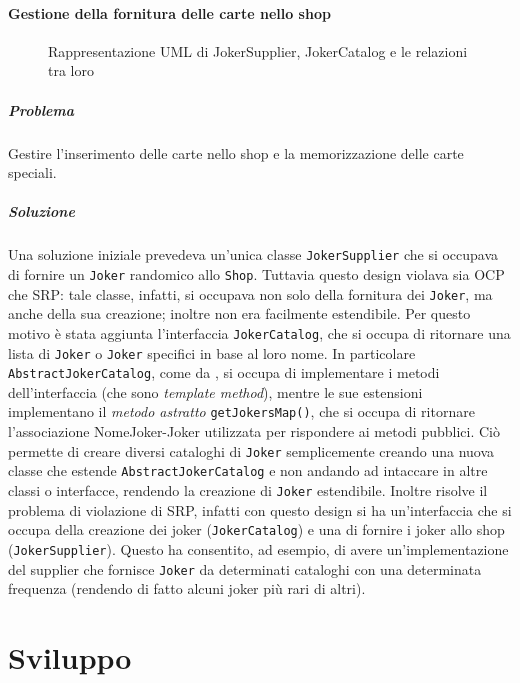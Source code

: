 \documentclass[a4paper,12pt]{report}
\begin{document}
\subsubsection*{Gestione della fornitura delle carte nello shop}
\begin{figure}[H]
	\centering{}
	
	\caption{Rappresentazione UML di JokerSupplier, JokerCatalog e le relazioni tra loro}
	\label{img:JokerSupplier}
\end{figure}
\paragraph{Problema}
Gestire l’inserimento delle carte nello shop e la memorizzazione delle carte speciali.
\paragraph{Soluzione}
Una soluzione iniziale prevedeva un’unica classe \texttt{JokerSupplier} che si occupava di fornire un \texttt{Joker} randomico allo \texttt{Shop}. Tuttavia questo design violava sia OCP che SRP: tale classe, infatti, si occupava non solo della fornitura dei \texttt{Joker}, ma anche della sua creazione; inoltre non era facilmente estendibile. Per questo motivo è stata aggiunta l’interfaccia \texttt{JokerCatalog}, che si occupa di ritornare una lista di \texttt{Joker} o \texttt{Joker} specifici in base al loro nome. In particolare \texttt{AbstractJokerCatalog}, come da , si occupa di implementare i metodi dell’interfaccia (che sono \textit{template method}), mentre le sue estensioni implementano il \textit{metodo astratto} \texttt{getJokersMap()}, che si occupa di ritornare l'associazione NomeJoker-Joker utilizzata per rispondere ai metodi pubblici. Ciò permette di creare diversi cataloghi di \texttt{Joker} semplicemente creando una nuova classe che estende \texttt{AbstractJokerCatalog} e non andando ad intaccare in altre classi o interfacce, rendendo la creazione di \texttt{Joker} estendibile. Inoltre risolve il problema di violazione di SRP, infatti con questo design si ha un’interfaccia che si occupa della creazione dei joker (\texttt{JokerCatalog}) e una di fornire i joker allo shop (\texttt{JokerSupplier}).  Questo ha consentito, ad esempio, di avere un’implementazione del supplier che fornisce \texttt{Joker} da determinati cataloghi con una determinata frequenza (rendendo di fatto alcuni joker più rari di altri).


\chapter{Sviluppo}
\end{document}
